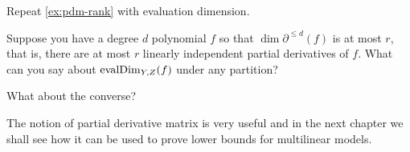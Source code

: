 \begin{exercise}
Repeat \autoref{ex:pdm-rank} with evaluation dimension. 
\end{exercise}

\begin{exercise}
Suppose you have a degree $d$ polynomial $f$ so that $\dim{\partial^{\leq d}(f)}$ is at most $r$, that is, there are at most $r$ linearly independent partial derivatives of $f$. What can you say about $\operatorname{evalDim}_{Y,Z}(f)$ under any partition? 

What about the converse?
\end{exercise}

\bigskip 

The notion of partial derivative matrix is very useful and in the next chapter we shall see how it can be used to prove lower bounds for multilinear models.

